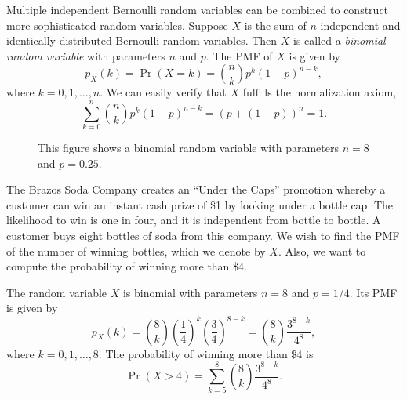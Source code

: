 Multiple independent Bernoulli random variables can be combined to construct more sophisticated random variables.
Suppose $X$ is the sum of $n$ independent and identically distributed Bernoulli random variables.
Then $X$ is called a \emph{binomial random variable} with parameters $n$ and $p$. 
The PMF of $X$ is given by
\begin{equation*}
p_X (k) = \Pr (X = k)
= \binom{n}{k} p^k (1-p)^{n-k},
\end{equation*}
where $k = 0, 1, \ldots, n$.
We can easily verify that $X$ fulfills the normalization axiom,
\begin{equation*}
\sum_{k=0}^n \binom{n}{k} p^k (1-p)^{n-k}
= \left( p + (1-p) \right)^n = 1.
\end{equation*}

\begin{figure}[ht]
\begin{center}
\end{center}
\caption{This figure shows a binomial random variable with parameters $n = 8$ and $p = 0.25$.}
\end{figure}

\begin{example} \label{BrazosSodaCompany1}
The Brazos Soda Company creates an ``Under the Caps'' promotion whereby a customer can win an instant cash prize of \$1 by looking under a bottle cap.
The likelihood to win is one in four, and it is independent from bottle to bottle.
A customer buys eight bottles of soda from this company.
We wish to find the PMF of the number of winning bottles, which we denote by $X$.
Also, we want to compute the probability of winning more than \$4.

The random variable $X$ is binomial with parameters $n = 8$ and $p = 1/4$.
Its PMF is given by
\begin{equation*}
p_X (k) = \binom{8}{k} \left( \frac{1}{4} \right)^k
\left( \frac{3}{4} \right)^{8-k}
= \binom{8}{k} \frac{3^{8-k}}{4^8} ,
\end{equation*}
where $k = 0, 1, \ldots, 8$.
The probability of winning more than \$4 is
\begin{equation*}
\Pr (X > 4)
= \sum_{k=5}^{8} \binom{8}{k} \frac{3^{8-k}}{4^8} .
\end{equation*}
\end{example}


